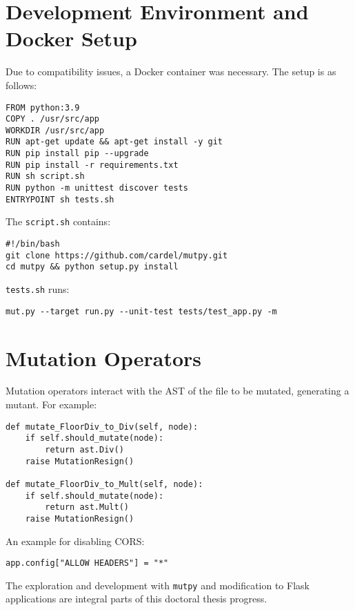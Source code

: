 \documentclass[12pt, letterpaper,twocolumn]{article}
\theoremstyle{remark}
\theoremstyle{definition}
\begin{document}
\section{Development Environment and Docker Setup}

Due to compatibility issues, a Docker container was necessary. The setup is as follows:

\begin{lstlisting}
FROM python:3.9
COPY . /usr/src/app
WORKDIR /usr/src/app
RUN apt-get update && apt-get install -y git
RUN pip install pip --upgrade
RUN pip install -r requirements.txt
RUN sh script.sh
RUN python -m unittest discover tests
ENTRYPOINT sh tests.sh
\end{lstlisting}

The \texttt{script.sh} contains:

\begin{lstlisting}
#!/bin/bash
git clone https://github.com/cardel/mutpy.git
cd mutpy && python setup.py install
\end{lstlisting}

\texttt{tests.sh} runs:

\begin{lstlisting}
mut.py --target run.py --unit-test tests/test_app.py -m
\end{lstlisting}

\section{Mutation Operators}

Mutation operators interact with the AST of the file to be mutated, generating a mutant. For example:

\begin{lstlisting}
def mutate_FloorDiv_to_Div(self, node):
    if self.should_mutate(node):
        return ast.Div()
    raise MutationResign()

def mutate_FloorDiv_to_Mult(self, node):
    if self.should_mutate(node):
        return ast.Mult()
    raise MutationResign()
\end{lstlisting}


An example for disabling CORS:

\begin{lstlisting}
app.config["ALLOW HEADERS"] = "*"
\end{lstlisting}

The exploration and development with \texttt{mutpy} and modification to Flask applications are integral parts of this doctoral thesis progress.
\end{document}
